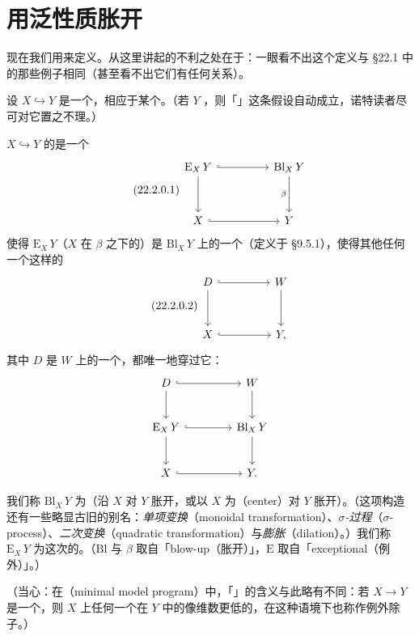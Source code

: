
\section{用泛性质胀开}

现在我们用\trUniversalProperty{}来定义\trBlowup。从这里讲起的不利之处在于：一眼看不出这个定义与 \S22.1 中的那些例子相同（甚至看不出它们有任何关系）。

设 $X\hookrightarrow Y$ 是一个\trClosedSubscheme，相应于某个\trFiniteType\trQC\trIdealSheaf。（若 $Y$ \trLocally\trNoetherian，则「\trFiniteType」这条假设自动成立，诺特读者尽可对它置之不理。）

$X\hookrightarrow Y$ 的\trBlowup{}是一个\trCartesianDiagram
\[
\tag{22.2.0.1}\label{eq:blowup-cartesian-diagram}
\begin{tikzcd}[row sep=3.2em, column sep=4.6em]
\mathrm{E}_X\,Y \ar[r,hook] \ar[d] & \mathrm{Bl}_X\,Y \ar[d,"\beta"'] \\
X \ar[r,hook] & Y
\end{tikzcd}
\]
使得 $\mathrm{E}_X\,Y$（$X$ 在 $\beta$ 之下的\trSchemeTheoreticPreimage）是 $\mathrm{Bl}_X\,Y$ 上的一个\trEffectiveCartierDivisor（定义于 \S9.5.1），使得其他任何一个这样的\trCartesianDiagram
\[
\tag{22.2.0.2}\label{eq:blowup-competing-diagram}
\begin{tikzcd}[row sep=3.2em, column sep=4.6em]
D \ar[r,hook] \ar[d] & W \ar[d] \\
X \ar[r,hook] & Y,
\end{tikzcd}
\]
其中 $D$ 是 $W$ 上的一个\trEffectiveCartierDivisor，都唯一地穿过它：
\[
\begin{tikzcd}[row sep=2.5em, column sep=4.2em]
D \ar[r,hook] \ar[d] & W \ar[d] \\
\mathrm{E}_X\,Y \ar[r,hook] \ar[d] & \mathrm{Bl}_X\,Y \ar[d] \\
X \ar[r,hook] & Y.
\end{tikzcd}
\]

我们称 $\mathrm{Bl}_X\,Y$ 为\textbf{\trBlowup}（沿 $X$ 对 $Y$ 胀开，或以 $X$ 为\textbf{\trCenter}（center）对 $Y$ 胀开）。（这项构造还有一些略显古旧的别名：\emph{单项变换}（monoidal transformation）、\emph{$\sigma$-过程}（$\sigma$-process）、\emph{二次变换}（quadratic transformation）与\emph{膨胀}（dilation）。）我们称 $\mathrm{E}_X\,Y$ 为这次\trBlowup{}的\trExceptionalDivisor。（$\mathrm{Bl}$ 与 $\beta$ 取自「blow-up（胀开）」，$\mathrm{E}$ 取自「exceptional（例外）」。）

（当心：在\trMinimalModelProgram（minimal model program）中，「\trExceptionalDivisor」的含义与此略有不同：若 $X\to Y$ 是一个\trBirational\trMorphism，则 $X$ 上任何一个在 $Y$ 中的像维数更低的\trWeilDivisor，在这种语境下也称作例外除子。）

